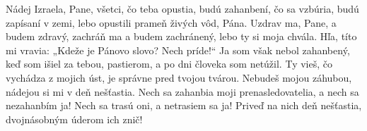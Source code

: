 Nádej Izraela, Pane,
všetci, čo teba opustia, budú zahanbení,
čo sa vzbúria, budú zapísaní v zemi,
lebo opustili prameň živých vôd, Pána.
Uzdrav ma, Pane, a budem zdravý,
zachráň ma a budem zachránený,
lebo ty si moja chvála.
Hľa, títo mi vravia:
„Kdeže je Pánovo slovo? Nech príde!“
Ja som však nebol zahanbený,
keď som išiel za tebou, pastierom,
a po dni človeka som netúžil.
Ty vieš, čo vychádza z mojich úst,
je správne pred tvojou tvárou.
Nebudeš mojou záhubou,
nádejou si mi v deň nešťastia.
Nech sa zahanbia moji prenasledovatelia,
a nech sa nezahanbím ja!
Nech sa trasú oni, a netrasiem sa ja!
Priveď na nich deň nešťastia,
dvojnásobným úderom ich znič!

